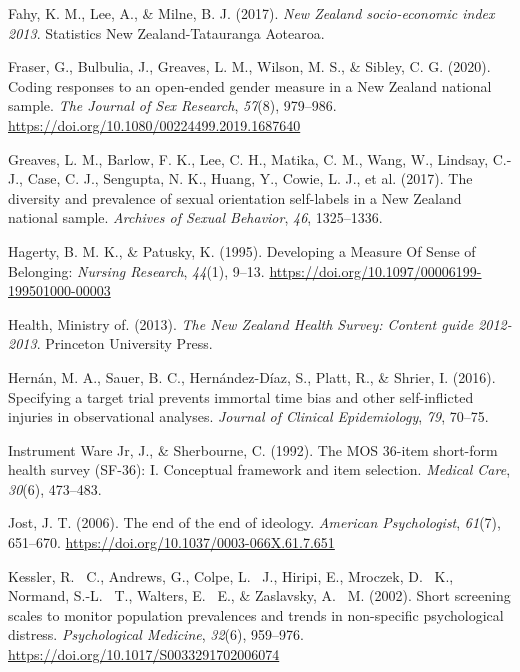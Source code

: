 \documentclass[
  single column]{article}
\newlength{\cslhangindent}
\newenvironment{CSLReferences}[2] %
 {\begin{list}{}{%
  \setlength{\itemindent}{0pt}
  \setlength{\leftmargin}{0pt}
  \setlength{\parsep}{0pt}
  \ifodd #1
   \setlength{\leftmargin}{\cslhangindent}
   \setlength{\itemindent}{-1\cslhangindent}
  \fi
  \setlength{\itemsep}{#2\baselineskip}}}
 {\end{list}}
\begin{document}
\begin{CSLReferences}{1}{0}
Fahy, K. M., Lee, A., \& Milne, B. J. (2017). \emph{{N}ew {Z}ealand
socio-economic index 2013}. Statistics New Zealand-Tatauranga Aotearoa.

Fraser, G., Bulbulia, J., Greaves, L. M., Wilson, M. S., \& Sibley, C.
G. (2020). Coding responses to an open-ended gender measure in a {N}ew
{Z}ealand national sample. \emph{The Journal of Sex Research},
\emph{57}(8), 979--986.
\url{https://doi.org/10.1080/00224499.2019.1687640}

Greaves, L. M., Barlow, F. K., Lee, C. H., Matika, C. M., Wang, W.,
Lindsay, C.-J., Case, C. J., Sengupta, N. K., Huang, Y., Cowie, L. J.,
et al. (2017). The diversity and prevalence of sexual orientation
self-labels in a {N}ew {Z}ealand national sample. \emph{Archives of
Sexual Behavior}, \emph{46}, 1325--1336.

Hagerty, B. M. K., \& Patusky, K. (1995). Developing a Measure Of Sense
of Belonging: \emph{Nursing Research}, \emph{44}(1), 9--13.
\url{https://doi.org/10.1097/00006199-199501000-00003}

Health, Ministry of. (2013). \emph{The {N}ew {Z}ealand {H}ealth
{S}urvey: Content guide 2012-2013}. Princeton University Press.

Hernán, M. A., Sauer, B. C., Hernández-Díaz, S., Platt, R., \& Shrier,
I. (2016). Specifying a target trial prevents immortal time bias and
other self-inflicted injuries in observational analyses. \emph{Journal
of Clinical Epidemiology}, \emph{79}, 70--75.

Instrument Ware Jr, J., \& Sherbourne, C. (1992). The MOS 36-item
short-form health survey (SF-36): I. Conceptual framework and item
selection. \emph{Medical Care}, \emph{30}(6), 473--483.

Jost, J. T. (2006). The end of the end of ideology. \emph{American
Psychologist}, \emph{61}(7), 651--670.
\url{https://doi.org/10.1037/0003-066X.61.7.651}

Kessler, R. ~C., Andrews, G., Colpe, L. ~J., Hiripi, E., Mroczek, D.
~K., Normand, S.-L. ~T., Walters, E. ~E., \& Zaslavsky, A. ~M. (2002).
Short screening scales to monitor population prevalences and trends in
non-specific psychological distress. \emph{Psychological Medicine},
\emph{32}(6), 959--976. \url{https://doi.org/10.1017/S0033291702006074}


\end{CSLReferences}
\end{document}
